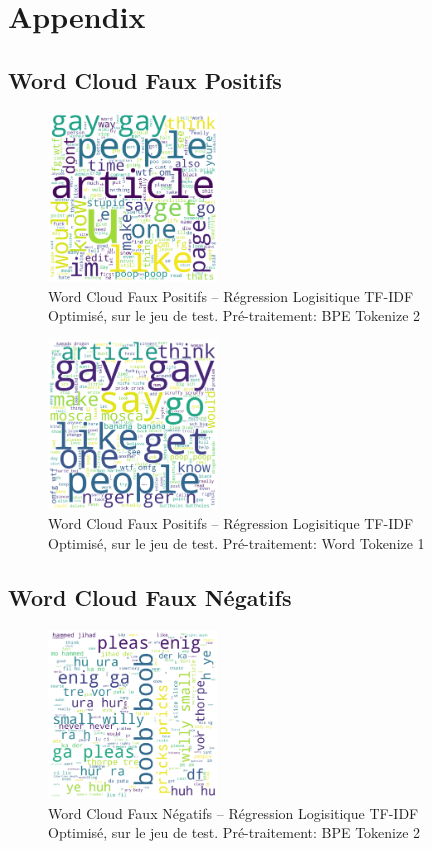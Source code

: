 \chapter{Appendix}
\label{chap:appendix_reg}

\section{Word Cloud Faux Positifs}
\begin{figure}[h]
    \centering
    \includegraphics[width=0.4\textwidth]{figures/word-cloud-reg-tf-fp.png}
    \caption{Word Cloud Faux Positifs – Régression Logisitique TF-IDF Optimisé, sur le jeu de test. Pré-traitement: BPE Tokenize 2}
\end{figure}

\begin{figure}[h]
    \centering
    \includegraphics[width=0.4\textwidth]{figures/word-cloud-reg-w2v-fp.png}
    \caption{Word Cloud Faux Positifs – Régression Logisitique TF-IDF Optimisé, sur le jeu de test. Pré-traitement: Word Tokenize 1}
\end{figure}

\newpage
\section{Word Cloud Faux Négatifs}
\begin{figure}[h]
    \centering
    \includegraphics[width=0.4\textwidth]{figures/word-cloud-reg-tf-fn.png}
    \caption{Word Cloud Faux Négatifs – Régression Logisitique TF-IDF Optimisé, sur le jeu de test. Pré-traitement: BPE Tokenize 2}
\end{figure}


